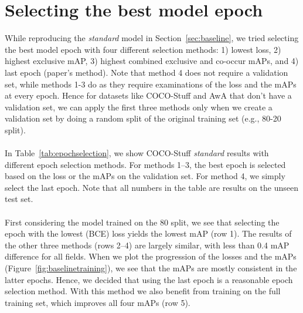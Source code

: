 \section{Selecting the best model epoch} \label{sec:epochselection}

While reproducing the \textit{standard} model in Section~\ref{sec:baseline}, we tried selecting the best model epoch with four different selection methods: 1) lowest loss, 2) highest exclusive mAP, 3) highest combined exclusive and co-occur mAPs, and 4) last epoch (paper's method). Note that method 4 does not require a validation set, while methods 1-3 do as they require examinations of the loss and the mAPs at every epoch. Hence for datasets like COCO-Stuff and AwA that don't have a validation set, we can apply the first three methods only when we create a validation set by doing a random split of the original training set (e.g., 80-20 split).\\
\\
In Table~\ref{tab:epochselection}, we show COCO-Stuff \textit{standard} results with different epoch selection methods. For methods 1–3, the best epoch is selected based on the loss or the mAPs on the validation set. For method 4, we simply select the last epoch. Note that all numbers in the table are results on the unseen test set. \\
\\
First considering the model trained on the 80 split, we see that selecting the epoch with the lowest (BCE) loss yields the lowest mAP (row 1). The results of the other three methods (rows 2–4) are largely similar, with less than 0.4 mAP difference for all fields. When we plot the progression of the losses and the mAPs (Figure~\ref{fig:baselinetraining}), we see that the mAPs are mostly consistent in the latter epochs. Hence, we decided that using the last epoch is a reasonable epoch selection method. With this method we also benefit from training on the full training set, which improves all four mAPs (row 5).

\begin{table}[h!]
\centering
\caption{COCO-Stuff \textit{standard} baseline results with different model epoch selection methods. All numbers are results on the test set. The best results are in bold.}
\label{tab:epochselection}
\end{table}

